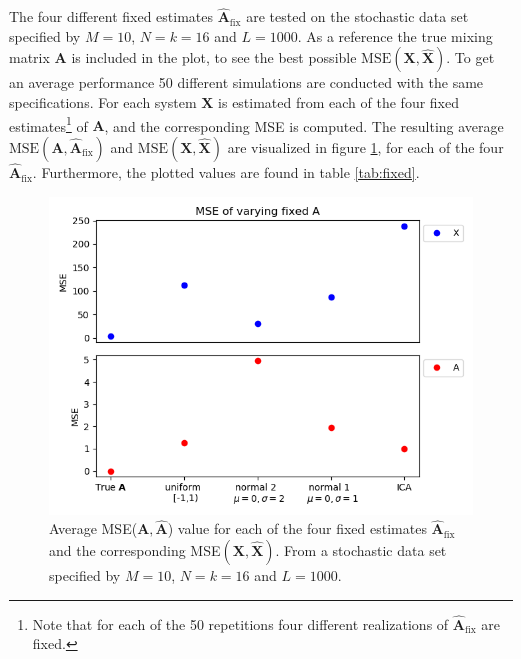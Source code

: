 The four different fixed estimates $\hat{\mathbf{A}}_{\text{fix}}$ are tested on the stochastic data set specified by $M = 10$, $N = k = 16$ and $L = 1000$. 
As a reference the true mixing matrix $\mathbf{A}$ is included in the plot, to see the best possible $\text{MSE}(\mathbf{X}, \hat{\mathbf{X}})$.
To get an average performance 50 different simulations are conducted with the same specifications. For each system $\mathbf{X}$ is estimated from each of the four fixed estimates\footnote{Note that for each of the 50 repetitions four different realizations of $\hat{\mathbf{A}}_{\text{fix}}$ are fixed.} of $\mathbf{A}$, and the corresponding MSE is computed. 
The resulting average $\text{MSE}(\mathbf{A}, \hat{\mathbf{A}}_{\text{fix}})$ and $\text{MSE}(\mathbf{X}, \hat{\mathbf{X}})$ are visualized in figure \ref{fig:vary_A}, for each of the four $\hat{\mathbf{A}}_{\text{fix}}$. 
Furthermore, the plotted values are found in table \ref{tab:fixed}.
\begin{figure}[H]
\centering
\includegraphics[scale=0.5]{figures/ch_6/A_fix1.png}
\caption{Average MSE($\textbf{A},\hat{\mathbf{A}}$) value for each of the four fixed estimates $\hat{\mathbf{A}}_{\text{fix}}$ and the corresponding MSE$(\textbf{X},\hat{\mathbf{X}})$. From a stochastic data set specified by $M = 10$, $N = k = 16$ and $L = 1000$.}
\label{fig:vary_A}
\end{figure}
\noindent
%
